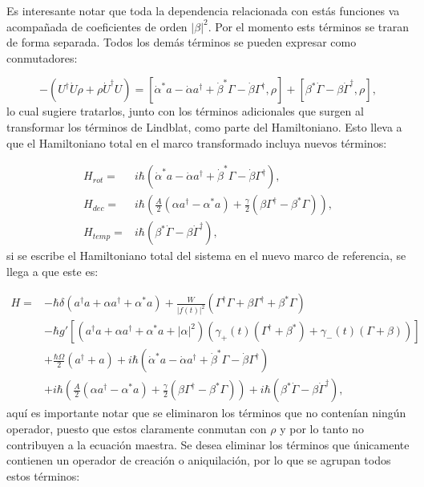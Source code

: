 \documentclass[a4paper,10pt]{report}
\begin{document}
Es interesante notar que toda la dependencia relacionada con estás funciones va acompañada de coeficientes de orden $|\beta|^2$. Por el momento ests términos se traran de forma separada. Todos los demás términos se pueden expresar como conmutadores:

\begin{equation}
-(U^{\dagger}\dot{U}\rho + \rho \dot{U}^\dagger U) = [\dot{\alpha}^*a-\dot{\alpha}a^\dagger+\dot{\beta}^*\Gamma-\dot{\beta}\Gamma^\dagger,\rho]+ [\beta^*\dot{\Gamma} - \beta \dot{\Gamma}^\dagger,\rho],
\end{equation} lo cual sugiere tratarlos, junto con los términos adicionales que surgen al transformar los términos de Lindblat, como parte del Hamiltoniano. Esto lleva a que el Hamiltoniano total en el marco transformado incluya nuevos términos:

\begin{align}
H_{rot} =& i\hbar(\dot{\alpha}^*a-\dot{\alpha}a^\dagger+\dot{\beta}^*\Gamma-\dot{\beta}\Gamma^\dagger),\\
H_{dec} =& i\hbar(\frac{A}{2}(\alpha a^\dagger - \alpha^*a)+\frac{\gamma}{2}(\beta\Gamma^{\dagger}-\beta^* \Gamma)),\\
H_{temp}=& i\hbar(\beta^*\dot{\Gamma} - \beta \dot{\Gamma}^\dagger),
\end{align} si se escribe el Hamiltoniano total del sistema en el nuevo marco de referencia, se llega a que este es:

\begin{align*}
H =& -\hbar \delta(a^{\dagger}a +\alpha a^{\dagger}+\alpha^* a)+\frac{W}{|f(t)|^2}(\Gamma^{\dagger}\Gamma + \beta \Gamma^{\dagger} + \beta^* \Gamma)\\
 &-\hbar g'[(a^{\dagger}a +\alpha a^{\dagger}+\alpha^* a + |\alpha|^2)(\gamma_+(t)(\Gamma^{\dagger}+\beta^*)+\gamma_-(t)(\Gamma+\beta))]\\
 &+\frac{\hbar \Omega}{2}(a^{\dagger} + a)+i\hbar(\dot{\alpha}^*a-\dot{\alpha}a^\dagger+\dot{\beta}^*\Gamma-\dot{\beta}\Gamma^\dagger)\\
 &+i\hbar(\frac{A}{2}(\alpha a^\dagger - \alpha^*a)+\frac{\gamma}{2}(\beta\Gamma^{\dagger}-\beta^* \Gamma))+i\hbar(\beta^*\dot{\Gamma} - \beta \dot{\Gamma}^\dagger),
\end{align*} aquí es importante notar que se eliminaron los términos que no contenían ningún operador, puesto que estos claramente conmutan con $\rho$ y por lo tanto no contribuyen a la ecuación maestra. Se desea eliminar los términos que únicamente contienen un operador de creación o aniquilación, por lo que se agrupan todos estos términos: 
\end{document}
